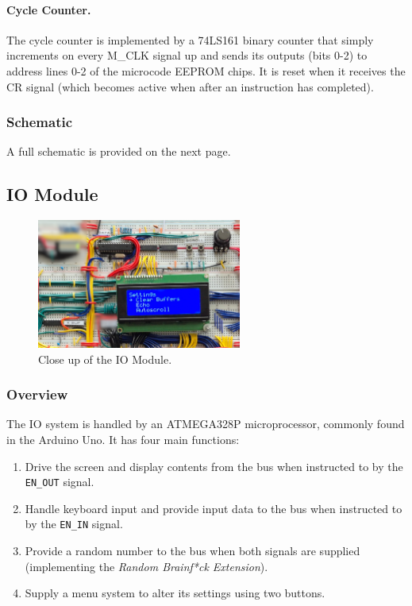 \paragraph{Cycle Counter.} The cycle counter is implemented by a 74LS161 binary counter that simply increments on every M\_CLK signal up and sends its outputs (bits 0-2) to address lines 0-2 of the microcode EEPROM chips. It is reset when it receives the CR signal (which becomes active when after an instruction has completed).


\subsubsection{Schematic}
A full schematic is provided on the next page.


\subsection{IO Module} \label{sec:implementation:io}
\begin{figure}[H]
  \centering
  \includegraphics[width=0.6\textwidth]{img/iomodulecloseup}
  \caption{Close up of the IO Module.}
  \label{fig:iomodulecloseup}
\end{figure}

\subsubsection{Overview}
The IO system is handled by an ATMEGA328P microprocessor, commonly found in the Arduino Uno. It has four main functions:
\begin{enumerate}
\item Drive the screen and display contents from the bus when instructed to by the \texttt{EN\_OUT} signal.
\item Handle keyboard input and provide input data to the bus when instructed to by the \texttt{EN\_IN} signal.
\item Provide a random number to the bus when both signals are supplied (implementing the \emph{Random Brainf*ck Extension}).
\item Supply a menu system to alter its settings using two buttons.
\end{enumerate}

